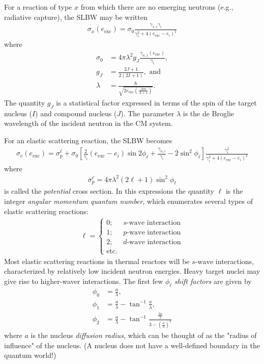 \documentclass[11pt]{article}
\begin{document}
For a reaction of type \(x\) from which there are no emerging neutrons (e.g., radiative capture), the SLBW may be written
\begin{align}
  \sigma_x(e_{\text{exc}}) = \sigma_0 \frac{\gamma_{x,i}\gamma_i}{\gamma_i^2+4(e_\text{exc}-e_i)^2}
\end{align}
where
\begin{align}
 \sigma_0 &= 4\pi \lambda^2 g_J \frac{\gamma_{n,1}(e_\text{exc})}{\gamma_i},  \\
  g_J &= \frac{2J+1}{2(2I+1)}, \text{ and} \\
  \lambda &= \frac{\hbar}{\sqrt{2e_\text{exc} \left( \frac{Am}{A+1} \right)}}.
\end{align}
The quantity \(g_J\) is a statistical factor expressed in terms of the spin of the target nucleus (\(I\)) and compound nucleus (\(J\)).  The parameter \(\lambda\) is the de Broglie wavelength of the incident neutron in the CM system.

For an elastic scattering reaction, the SLBW becomes
\begin{align}
  \sigma_e(e_\text{exc}) = \sigma_p^\ell 
                         + \sigma_0 \left[ \frac{2}{\gamma_i}(e_\text{exc}-e_i) \sin 2\phi_\ell 
                                         + \frac{\gamma_{n,i}}{\gamma_i} -2 \sin^2 \phi_\ell \right] \frac{\gamma_i^2}{\gamma_i^2+4(e_\text{exc}-e_i)^2}
\end{align}
where
\begin{align}
  \sigma_p^\ell = 4\pi \lambda^2 \left( 2\ell + 1 \right) \sin^2 \phi_\ell
\end{align}
is called the \emph{potential} cross section.
In this expressions the quantity \(\ell\) is the integer \emph{angular momentum quantum number}, which enumerates several types of elastic scattering reactions:
\begin{align}
  \ell = 
  \begin{cases}
    0; & s\text{-wave interaction} \\
    1; & p\text{-wave interaction} \\
    2; & d\text{-wave interaction} \\
    \text{etc.} &
  \end{cases}
\end{align}
Most elastic scattering reactions in thermal reactors will be \(s\text{-wave}\) interactions, characterized by relatively low incident neutron energies.  Heavy target nuclei may give rise to higher-waver interactions.  The first few \(\phi_\ell\) \emph{shift factors} are given by
\begin{align}
  \phi_0 &= \frac{a}{\lambda}, \\
  \phi_1 &= \frac{a}{\lambda} - \tan^{-1} \frac{a}{\lambda}, \\
  \phi_2 &= \frac{a}{\lambda} - \tan^{-1} \frac{\frac{3a}{\lambda}}{3 - \left( \frac{a}{\lambda} \right)^2}
\end{align}
where \(a\) is the nucleus \emph{diffusion radius}, which can be thought of as the "radius of influence" of the nucleus.  (A nucleus does not have a well-defined boundary in the quantum world!)
\end{document}
